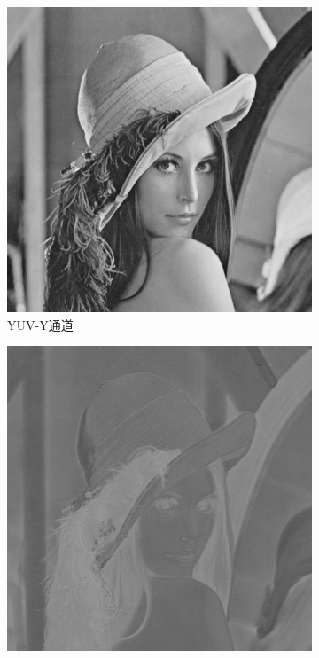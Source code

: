 \begin{figure}[ht]
    \centering
    \begin{subfigure}{0.245\textwidth}
        \includegraphics[width=\linewidth]{pages/jpeg/yuv-y.jpg}
        \caption{YUV-Y通道}
        \label{Fig:RGB2YUV-y}
      \end{subfigure}
      \begin{subfigure}{0.245\textwidth}
        \includegraphics[width=\linewidth]{pages/jpeg/yuv-u.jpg}

\end{subfigure}
\end{figure}
